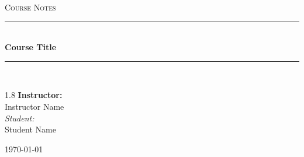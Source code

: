 \documentclass[11pt, a4paper]{report}
\newcommand{\HRule}[1]{\rule{\linewidth}{#1}}
\newcommand{\CourseTitle}{Course Title}
\newcommand{\CourseSubtitle}{Course Notes}
\newcommand{\InstructorName}{Instructor Name}
\newcommand{\StudentName}{Student Name}
\begin{document}
\begin{titlepage}
    \centering
    \vspace*{2cm}

    \textsc{\Large \CourseSubtitle}\\[0.5cm]

    \HRule{1.5pt} \\[0.5cm]
    {\huge \bfseries \CourseTitle}\\[0.4cm]
    \HRule{1.5pt} \\[1.5cm]

    \vspace{3cm}

    \begin{spacing}{1.8}
        {\Large \textbf{Instructor:}} \\
        {\Large \InstructorName} \\[0.8cm]

        {\normalsize \textit{Student:}} \\
        {\normalsize \StudentName}
    \end{spacing}

    \vfill
    {\large \today}
\end{titlepage}
\newpage
\tableofcontents
\newpage


\end{document}

